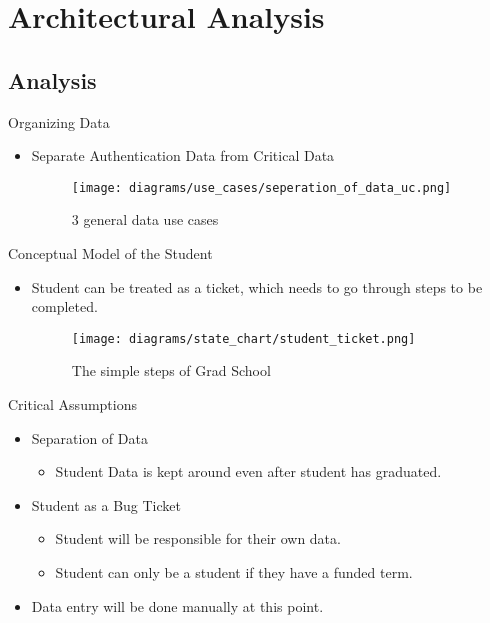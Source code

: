 \documentclass{beamer}
\begin{document}
\section{Architectural Analysis}

\subsection{Analysis}
\begin{frame}{Organizing Data}
\begin{itemize}
\item
Separate Authentication Data from Critical Data
\begin{figure}[!h]
\texttt{[image: diagrams/use\_cases/seperation\_of\_data\_uc.png]} \caption{ 3 general data use cases } \label{fig:Users}
\end{figure}

\end{itemize}
\end{frame}
\begin{frame}{Conceptual Model of the Student}
\begin{itemize}
\item
Student can be treated as a ticket, which needs to go through steps to be completed.
\begin{figure}[!h]
\texttt{[image: diagrams/state\_chart/student\_ticket.png]} \caption{ The simple steps of Grad School } \label{fig:Users}
\end{figure}
\end{itemize}
\end{frame}
\begin{frame}{Critical Assumptions}
\begin{itemize}
\item Separation of Data
\begin{itemize}
\item
Student Data is kept around even after student has graduated.
\end{itemize}
\item Student as a Bug Ticket
\begin{itemize}
\item
Student will be responsible for their own data.
\item
Student can only be a student if they have a funded term.
\end{itemize}
\item
Data entry will be done manually at this point.
\end{itemize}
\end{frame}
\end{document}
